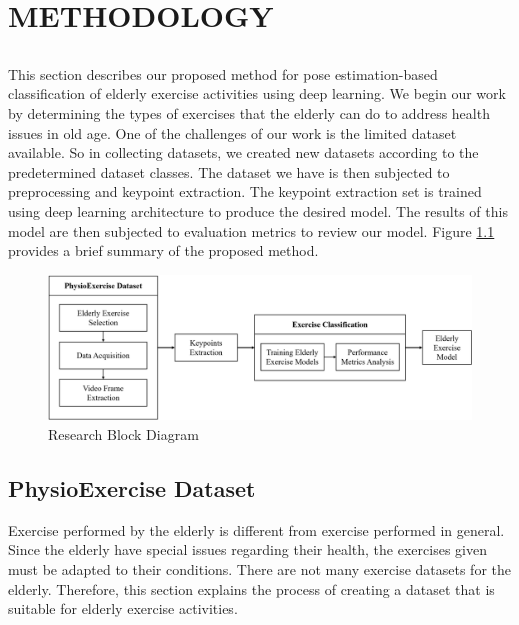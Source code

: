 \chapter{METHODOLOGY}
\label{sec:chap3_metodologi}

\section*{ }
This section describes our proposed method for pose estimation-based classification of elderly exercise activities using deep learning. We begin our work by determining the types of exercises that the elderly can do to address health issues in old age. One of the challenges of our work is the limited dataset available. So in collecting datasets, we created new datasets according to the predetermined dataset classes. The dataset we have is then subjected to preprocessing and keypoint extraction. The keypoint extraction set is trained using deep learning architecture to produce the desired model. The results of this model are then subjected to evaluation metrics to review our model. Figure \ref{fig:blokdiagram} provides a brief summary of the proposed method.

\begin{figure}[h!]
	\centering
	\includegraphics[width=\linewidth]{bab3/ar_BlockDiagram4.png}
	\caption{Research Block Diagram}
	\label{fig:blokdiagram}
\end{figure}

\section{PhysioExercise Dataset}
\label{sec3:physioexercise_dataset}
Exercise performed by the elderly is different from exercise performed in general. Since the elderly have special issues regarding their health, the exercises given must be adapted to their conditions. There are not many exercise datasets for the elderly. Therefore, this section explains the process of creating a dataset that is suitable for elderly exercise activities.


